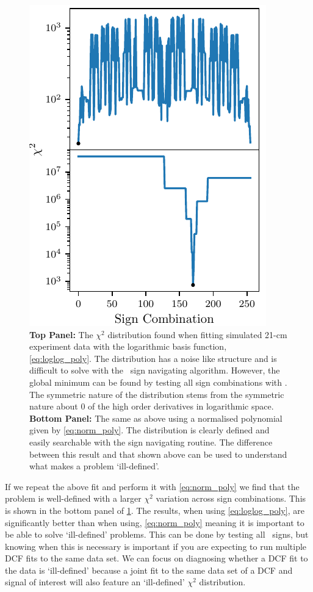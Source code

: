 \begin{figure}
    \centering
    \includegraphics{maxsmooth/figs/Figure5.pdf}
    \caption{\textbf{Top Panel:} The $\chi^2$ distribution found when fitting simulated 21-cm experiment data with the logarithmic basis function, \cref{eq:loglog_poly}. The distribution has a noise like structure and is difficult to solve with the \maxsmooth~sign navigating algorithm. However, the global minimum can be found by testing all sign combinations with \maxsmooth. The symmetric nature of the distribution stems from the symmetric nature about 0 of the high order derivatives in logarithmic space. \textbf{Bottom Panel:} The same as above using a normalised polynomial given by \cref{eq:norm_poly}. The distribution is clearly defined and easily searchable with the sign navigating routine. The difference between this result and that shown above can be used to understand what makes a problem `ill-defined'.}
    \label{fig:bad_problem_chi}
\end{figure}

If we repeat the above fit and perform it with \cref{eq:norm_poly} we find that the problem is well-defined with a larger $\chi^2$ variation across sign combinations. This is shown in the bottom panel of \cref{fig:bad_problem_chi}. The results, when using \cref{eq:loglog_poly}, are significantly better than when using, \cref{eq:norm_poly} meaning it is important to be able to solve `ill-defined' problems. This can be done by testing all \maxsmooth~signs, but knowing when this is necessary is important if you are expecting to run multiple DCF fits to the same data set. We can focus on diagnosing whether a DCF fit to the data is `ill-defined' because a joint fit to the same data set of a DCF and signal of interest will also feature an `ill-defined' $\chi^2$ distribution.

